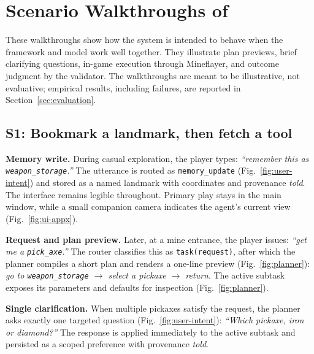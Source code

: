 \section{Scenario Walkthroughs of \systemname{}}
\label{sec:scenario-walkthroughs}

\noindent
These walkthroughs show how the system is intended to behave when the framework and model work well together. They illustrate plan previews, brief clarifying questions, in-game execution through Mineflayer, and outcome judgment by the validator. The walkthroughs are meant to be illustrative, not evaluative; empirical results, including failures, are reported in Section~\ref{sec:evaluation}.


\vspace{-2.5mm}

\subsection{S1: Bookmark a landmark, then fetch a tool}

\noindent
\textbf{Memory write.}
During casual exploration, the player types:
\emph{“remember this as \texttt{weapon\_storage}.”}
The utterance is routed as \texttt{memory\_update} (Fig.~\ref{fig:user-intent}) and stored as a named landmark with coordinates and provenance \textit{told}. The interface remains legible throughout. Primary play stays in the main window, while a small companion camera indicates the agent’s current view (Fig.~\ref{fig:ui-appx}).

\noindent
\textbf{Request and plan preview.}
Later, at a mine entrance, the player issues:
\emph{“get me a \texttt{pick\_axe}.”}
The router classifies this as \texttt{task(request)}, after which the planner compiles a short plan and renders a one-line preview (Fig.~\ref{fig:planner}):
\emph{go to \texttt{weapon\_storage} $\rightarrow$ select a pickaxe $\rightarrow$ return}.
The active subtask exposes its parameters and defaults for inspection (Fig.~\ref{fig:planner}).

\noindent
\textbf{Single clarification.}
When multiple pickaxes satisfy the request, the planner asks exactly one targeted question (Fig.~\ref{fig:user-intent}):
\emph{“Which pickaxe, iron or diamond?”}
The response is applied immediately to the active subtask and persisted as a scoped preference with provenance \textit{told}.

